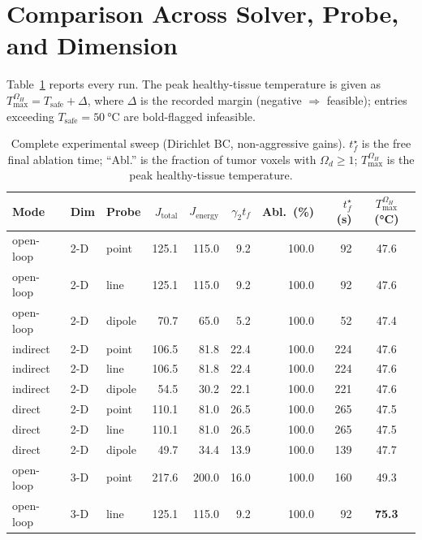 \section{Comparison Across Solver, Probe, and Dimension}
\label{sec:comparison}

Table~\ref{tab:full-sweep} reports every run.
The peak healthy-tissue temperature is given as
$T_{\max}^{\Omega_H} = T_{\text{safe}} + \Delta$, where $\Delta$ is the
recorded margin (negative $\Rightarrow$ feasible); entries exceeding
$T_{\text{safe}} = \SI{50}{\degreeCelsius}$ are bold-flagged infeasible.

\begin{table}[htbp]
\centering
\caption{Complete experimental sweep (Dirichlet BC, non-aggressive gains).
         $t_f^\star$ is the free final ablation time; ``Abl.'' is the
         fraction of tumor voxels with $\Omega_d \geq 1$;
         $T_{\max}^{\Omega_H}$ is the peak healthy-tissue temperature.}
\label{tab:full-sweep}
\renewcommand{\arraystretch}{1.25}
\setlength{\tabcolsep}{5pt}
\begin{tabular}{lll rrr rr c}
\toprule
Mode & Dim & Probe & $J_{\text{total}}$ & $J_{\text{energy}}$ & $\gamma_2 t_f$
     & Abl.\ (\%) & $t_f^\star$ (s) & $T_{\max}^{\Omega_H}$ (\si{\degreeCelsius}) \\
\midrule
open-loop & 2-D & point  & 125.1 & 115.0 & 9.2  & 100.0 & 92  & 47.6 \\
open-loop & 2-D & line   & 125.1 & 115.0 & 9.2  & 100.0 & 92  & 47.6 \\
open-loop & 2-D & dipole &  70.7 &  65.0 & 5.2  & 100.0 & 52  & 47.4 \\
indirect  & 2-D & point  & 106.5 &  81.8 & 22.4 & 100.0 & 224 & 47.6 \\
indirect  & 2-D & line   & 106.5 &  81.8 & 22.4 & 100.0 & 224 & 47.6 \\
indirect  & 2-D & dipole &  54.5 &  30.2 & 22.1 & 100.0 & 221 & 47.6 \\
direct    & 2-D & point  & 110.1 &  81.0 & 26.5 & 100.0 & 265 & 47.5 \\
direct    & 2-D & line   & 110.1 &  81.0 & 26.5 & 100.0 & 265 & 47.5 \\
direct    & 2-D & dipole &  49.7 &  34.4 & 13.9 & 100.0 & 139 & 47.7 \\
\midrule
open-loop & 3-D & point  & 217.6 & 200.0 & 16.0 & 100.0 & 160 & 49.3 \\
open-loop & 3-D & line   & 125.1 & 115.0 & 9.2  & 100.0 & 92  & \textbf{75.3} \\

\end{tabular}
\end{table}

